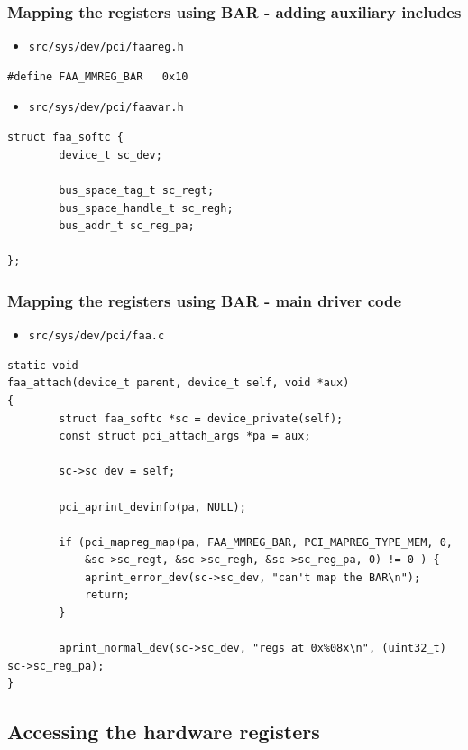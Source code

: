\documentclass[dvipsnames,table]{beamer}
\begin{document}
\begin{frame}[fragile]
\frametitle{Mapping the registers using BAR - adding auxiliary includes}
\scriptsize
\begin{itemize}
	\item {\tt src/sys/dev/pci/faareg.h}
\end{itemize}
\begin{verbatim}
#define FAA_MMREG_BAR   0x10
\end{verbatim}
\begin{itemize}
	\item {\tt src/sys/dev/pci/faavar.h}
\end{itemize}
\begin{verbatim}
struct faa_softc {
        device_t sc_dev;

        bus_space_tag_t sc_regt;
        bus_space_handle_t sc_regh;
        bus_addr_t sc_reg_pa;

};
\end{verbatim}
\end{frame}

\begin{frame}[fragile]
\frametitle{Mapping the registers using BAR - main driver code}
\scriptsize
\begin{itemize}
	\item {\tt src/sys/dev/pci/faa.c}
\end{itemize}
\begin{lstlisting}
static void
faa_attach(device_t parent, device_t self, void *aux)
{
        struct faa_softc *sc = device_private(self);
        const struct pci_attach_args *pa = aux;

        sc->sc_dev = self;

        pci_aprint_devinfo(pa, NULL);

        if (pci_mapreg_map(pa, FAA_MMREG_BAR, PCI_MAPREG_TYPE_MEM, 0, 
            &sc->sc_regt, &sc->sc_regh, &sc->sc_reg_pa, 0) != 0 ) {
            aprint_error_dev(sc->sc_dev, "can't map the BAR\n");
            return;
        }

        aprint_normal_dev(sc->sc_dev, "regs at 0x%08x\n", (uint32_t) sc->sc_reg_pa);
}
\end{lstlisting}
\end{frame}

\subsection{Accessing the hardware registers}
\end{document}
